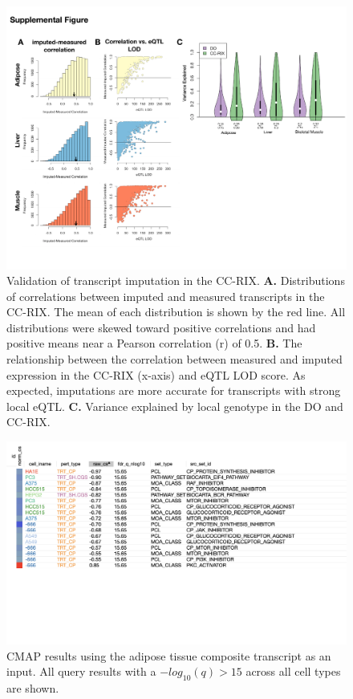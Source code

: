 \documentclass[
]{article}
\begin{document}
\begin{figure}[ht!]
\includegraphics[width=\textwidth]{Figures/Supp_Fig_CC-RIX_Imputation.pdf} 
\caption{Validation of transcript imputation in the CC-RIX. \textbf{A.} 
Distributions of correlations between imputed and measured transcripts 
in the CC-RIX. The mean of each distribution is shown by the red line. 
All distributions were skewed toward positive correlations and had
 positive means near a Pearson correlation (r) of 0.5. \textbf{B.} 
 The relationship between the correlation between measured and 
 imputed expression in the CC-RIX (x-axis) and eQTL LOD score. As 
 expected, imputations are more accurate for transcripts with strong 
 local eQTL. \textbf{C.} Variance explained by local genotype in the 
 DO and CC-RIX. 
}
\label{fig:cc_imputation}
\end{figure}

\begin{figure}[ht!]
\includegraphics[width=\textwidth]{Figures/Supp_Fig_Adipose_all_cell_types.png} 
\caption{CMAP results using the adipose tissue composite transcript as 
an input. All query results with a $-log_{10}(q) > 15$ across all cell types are 
shown.
}
\label{fig:clue_adipose_all}
\end{figure}
\end{document}
